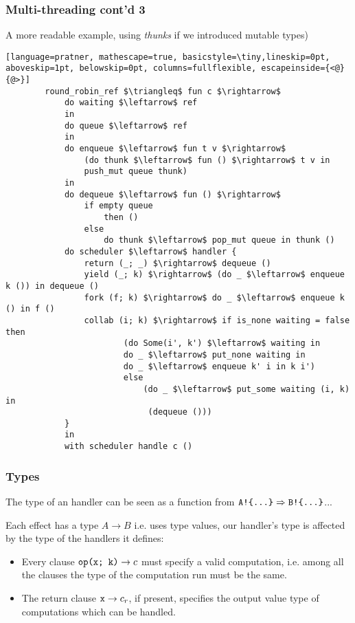 \documentclass[t]{beamer}
\begin{document}
	\begin{frame}[fragile]
	\frametitle{Multi-threading cont'd 3}
	A more readable example, using \textit{thunks} if we introduced \alert{mutable types})
	\begin{lstlisting}[language=pratner, mathescape=true, basicstyle=\tiny,lineskip=0pt, aboveskip=1pt, belowskip=0pt, columns=fullflexible, escapeinside={<@}{@>}]
		round_robin_ref $\triangleq$ fun c $\rightarrow$
			do waiting $\leftarrow$ ref 
			in
			do queue $\leftarrow$ ref 
			in
			do enqueue $\leftarrow$ fun t v $\rightarrow$ 
				(do thunk $\leftarrow$ fun () $\rightarrow$ t v in 
				push_mut queue thunk) 
			in
			do dequeue $\leftarrow$ fun () $\rightarrow$ 
				if empty queue 
					then () 
				else 
					do thunk $\leftarrow$ pop_mut queue in thunk ()
			do scheduler $\leftarrow$ handler {
				return (_; _) $\rightarrow$ dequeue ()
				yield (_; k) $\rightarrow$ (do _ $\leftarrow$ enqueue k ()) in dequeue ()
				fork (f; k) $\rightarrow$ do _ $\leftarrow$ enqueue k () in f ()
				collab (i; k) $\rightarrow$ if is_none waiting = false then 
						(do Some(i', k') $\leftarrow$ waiting in 
						do _ $\leftarrow$ put_none waiting in
						do _ $\leftarrow$ enqueue k' i in k i')
						else 
						    (do _ $\leftarrow$ put_some waiting (i, k) in
						     (dequeue ())) 
			} 
			in
			with scheduler handle c ()
	\end{lstlisting}
\end{frame}

\begin{frame}[fragile]
	\frametitle{Types}
	
	The type of an handler can be seen as a function from $\verb|A!{...}| \Rightarrow \verb|B!{...}|$...
	
	Each effect has a type $A\rightarrow B$ i.e. uses \alert{type values}, our handler's type is affected by the type of the handlers it defines:
	
	\begin{itemize}
		\item Every clause $\verb|op(x; k)| \rightarrow c$ must specify a valid computation, i.e. among all the clauses the type of the computation run must be the same.
		\item The return clause $\verb|x| \rightarrow  c_r$, if present, specifies the output value type of computations which can be handled.
	\end{itemize}
	
\end{frame}
	
\end{document}
